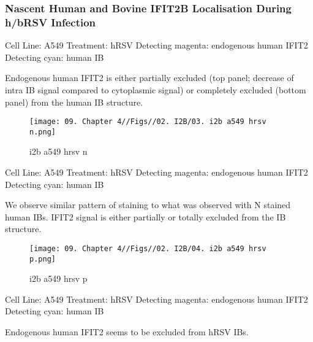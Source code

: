 \subsubsection{Nascent Human and Bovine IFIT2B Localisation During h/bRSV Infection} \label{Nascent Human and Bovine IFIT2B Localisation During h/bRSV Infection}
Cell Line: A549 \newline
Treatment: hRSV \newline
Detecting magenta: endogenous human IFIT2  \newline
Detecting cyan: human IB \newline

Endogenous human IFIT2 is either partially excluded (top panel; decrease of intra IB signal compared to cytoplasmic signal) or completely excluded (bottom panel) from the human IB structure.

\begin{figure}
    \centering
    \texttt{[image: 09. Chapter 4//Figs//02. I2B/03. i2b a549 hrsv n.png]}
    \caption[i2b a549 hrsv n]{i2b a549 hrsv n}
    \label{i2b a549 hrsv n}
\end{figure}

Cell Line: A549 \newline
Treatment: hRSV \newline
Detecting magenta: endogenous human IFIT2  \newline
Detecting cyan: human IB  \newline

We observe similar pattern of staining to what was observed with N stained human IBs. IFIT2 signal is either partially or totally excluded from the IB structure.

\begin{figure}
    \centering
    \texttt{[image: 09. Chapter 4//Figs//02. I2B/04. i2b a549 hrsv p.png]}
    \caption[i2b a549 hrsv p]{i2b a549 hrsv p}
    \label{i2b a549 hrsv p}
\end{figure}

Cell Line: A549 \newline
Treatment: hRSV \newline
Detecting magenta: endogenous human IFIT2  \newline
Detecting cyan: human IB \newline

Endogenous human IFIT2 seems to be excluded from hRSV IBs.

